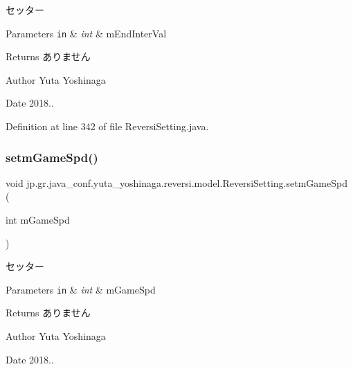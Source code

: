 セッター 


\begin{DoxyParams}[1]{Parameters}
\mbox{\tt in}  & {\em int} & m\+End\+Inter\+Val \\
\hline
\end{DoxyParams}
\begin{DoxyReturn}{Returns}
ありません 
\end{DoxyReturn}
\begin{DoxyAuthor}{Author}
Yuta Yoshinaga 
\end{DoxyAuthor}
\begin{DoxyDate}{Date}
2018.. 
\end{DoxyDate}


Definition at line 342 of file Reversi\+Setting.\+java.

\mbox{\label{classjp_1_1gr_1_1java__conf_1_1yuta__yoshinaga_1_1reversi_1_1model_1_1_reversi_setting_a23658b4244bacf68b40dfff9fc48429d}} 
\subsubsection{\texorpdfstring{setm\+Game\+Spd()}{setmGameSpd()}}
{\footnotesize\ttfamily void jp.\+gr.\+java\+\_\+conf.\+yuta\+\_\+yoshinaga.\+reversi.\+model.\+Reversi\+Setting.\+setm\+Game\+Spd (\begin{DoxyParamCaption}\item[{int}]{m\+Game\+Spd }\end{DoxyParamCaption})}



セッター 


\begin{DoxyParams}[1]{Parameters}
\mbox{\tt in}  & {\em int} & m\+Game\+Spd \\
\hline
\end{DoxyParams}
\begin{DoxyReturn}{Returns}
ありません 
\end{DoxyReturn}
\begin{DoxyAuthor}{Author}
Yuta Yoshinaga 
\end{DoxyAuthor}
\begin{DoxyDate}{Date}
2018.. 
\end{DoxyDate}


